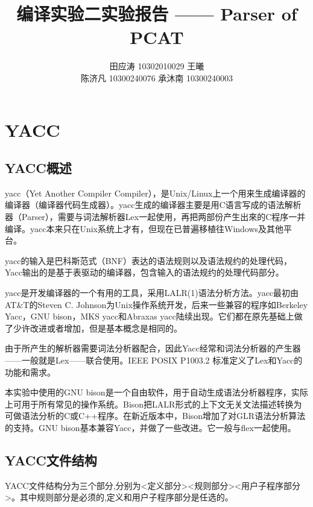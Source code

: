 \documentclass{article}
\title {编译实验二实验报告 —— Parser of PCAT}
\author {田应涛 10302010029 \quad 王曦 \quad 10300240014\\ 陈济凡 10300240076 \quad 承沐南 10300240003}
\begin{document}
\maketitle
\tableofcontents

\newpage
\section{YACC}
\subsection{YACC概述}
yacc（Yet Another Compiler Compiler），是Unix/Linux上一个用来生成编译器的编译器（编译器代码生成器）。yacc生成的编译器主要是用C语言写成的语法解析器（Parser），需要与词法解析器Lex一起使用，再把两部份产生出來的C程序一并编译。yacc本来只在Unix系统上才有，但现在已普遍移植往Windows及其他平台。

yacc的输入是巴科斯范式（BNF）表达的语法规则以及语法规约的处理代码，Yacc输出的是基于表驱动的编译器，包含输入的语法规约的处理代码部分。

yacc是开发编译器的一个有用的工具，采用LALR(1)语法分析方法。yacc最初由AT\&T的Steven C. Johnson为Unix操作系统开发，后来一些兼容的程序如Berkeley Yacc，GNU bison，MKS yacc和Abraxas yacc陆续出现。它们都在原先基础上做了少许改进或者增加，但是基本概念是相同的。

由于所产生的解析器需要词法分析器配合，因此Yacc经常和词法分析器的产生器——一般就是Lex——联合使用。IEEE POSIX P1003.2 标准定义了Lex和Yacc的功能和需求。

本实验中使用的GNU bison是一个自由软件，用于自动生成语法分析器程序，实际上可用于所有常见的操作系统。Bison把LALR形式的上下文无关文法描述转换为可做语法分析的C或C++程序。在新近版本中，Bison增加了对GLR语法分析算法的支持。GNU bison基本兼容Yacc，并做了一些改进。它一般与flex一起使用。
\subsection{YACC文件结构}
YACC文件结构分为三个部分,分别为<定义部分><规则部分><用户子程序部分>。其中规则部分是必须的,定义和用户子程序部分是任选的。
\end{document}
